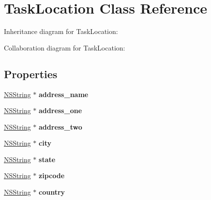 \hypertarget{interface_task_location}{
\section{\-Task\-Location \-Class \-Reference}
\label{interface_task_location}
}


\-Inheritance diagram for \-Task\-Location\-:


\-Collaboration diagram for \-Task\-Location\-:
\subsection*{\-Properties}
\begin{DoxyCompactItemize}
\item 
\hypertarget{interface_task_location_a36bb4dfea2ae951f8471fabb8bab5389}{
\hyperlink{class_n_s_string}{\-N\-S\-String} $\ast$ {\bfseries address\-\_\-name}}
\label{interface_task_location_a36bb4dfea2ae951f8471fabb8bab5389}

\item 
\hypertarget{interface_task_location_a00f7441ee8543a12bfc778c4be8de62c}{
\hyperlink{class_n_s_string}{\-N\-S\-String} $\ast$ {\bfseries address\-\_\-one}}
\label{interface_task_location_a00f7441ee8543a12bfc778c4be8de62c}

\item 
\hypertarget{interface_task_location_aaa31eb66e12b6fe20a1fb4c2934f9faa}{
\hyperlink{class_n_s_string}{\-N\-S\-String} $\ast$ {\bfseries address\-\_\-two}}
\label{interface_task_location_aaa31eb66e12b6fe20a1fb4c2934f9faa}

\item 
\hypertarget{interface_task_location_a9dac4af0d88fa62456ac0931a0eff0f1}{
\hyperlink{class_n_s_string}{\-N\-S\-String} $\ast$ {\bfseries city}}
\label{interface_task_location_a9dac4af0d88fa62456ac0931a0eff0f1}

\item 
\hypertarget{interface_task_location_ae729a489ac2751330c92f57faf4d6eb2}{
\hyperlink{class_n_s_string}{\-N\-S\-String} $\ast$ {\bfseries state}}
\label{interface_task_location_ae729a489ac2751330c92f57faf4d6eb2}

\item 
\hypertarget{interface_task_location_a26251405f7ad1dff830dc09b0bc18dac}{
\hyperlink{class_n_s_string}{\-N\-S\-String} $\ast$ {\bfseries zipcode}}
\label{interface_task_location_a26251405f7ad1dff830dc09b0bc18dac}

\item 
\hypertarget{interface_task_location_a880cfa106f46ad89adf7b213c18096b3}{
\hyperlink{class_n_s_string}{\-N\-S\-String} $\ast$ {\bfseries country}}
\label{interface_task_location_a880cfa106f46ad89adf7b213c18096b3}


\end{DoxyCompactItemize}
